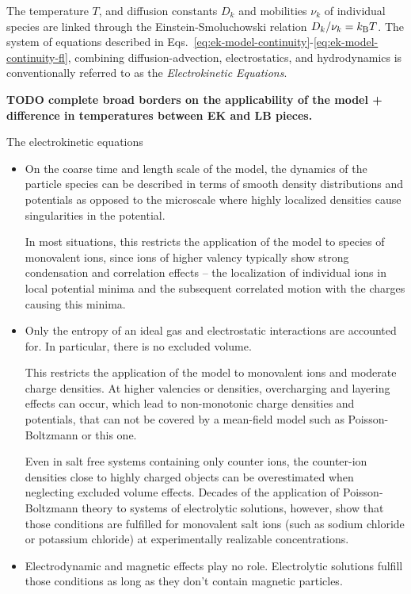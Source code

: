 The temperature $T$, and diffusion constants $D_k$ and mobilities $\nu_k$ of
individual species are linked through the Einstein-Smoluchowski relation $D_k /
\nu_k = \kT$. The system of equations described in
Eqs.~\eqref{eq:ek-model-continuity}-\eqref{eq:ek-model-continuity-fl}, combining 
diffusion-advection, electrostatics, and hydrodynamics is conventionally 
referred to as the \textit{Electrokinetic Equations}.

\textbf{TODO complete broad borders on the applicability of the model + difference in temperatures between EK and LB pieces.}

The electrokinetic equations 

\begin{itemize}
	\item On the coarse time and length scale of the model, the dynamics of the
	particle species can be described in terms of smooth density distributions and
	potentials as opposed to the microscale where highly localized densities cause
	singularities in the potential.
	
	In most situations, this restricts the application of the model to species of
	monovalent ions, since ions of higher valency typically show strong
	condensation and correlation effects -- the localization of individual ions in
	local potential minima and the subsequent correlated motion with the charges
	causing this minima.
	
	\item Only the entropy of an ideal gas and electrostatic interactions are
	accounted for. In particular, there is no excluded volume.
	
	This restricts the application of the model to monovalent ions and moderate
  charge densities. At higher valencies or densities, overcharging and layering
  effects can occur, which lead to non-monotonic charge densities and potentials,
  that can not be covered by a mean-field model such as Poisson-Boltzmann or this
  one.
	
	Even in salt free systems containing only counter ions, the counter-ion
	densities close to highly charged objects can be overestimated when neglecting
	excluded volume effects. Decades of the application of Poisson-Boltzmann
	theory to systems of electrolytic solutions, however, show that those
	conditions are fulfilled for monovalent salt ions (such as sodium chloride or
	potassium chloride) at experimentally realizable concentrations.
	
	\item Electrodynamic and magnetic effects play no role. Electrolytic solutions
	fulfill those conditions as long as they don't contain magnetic particles.
	

\end{itemize}
